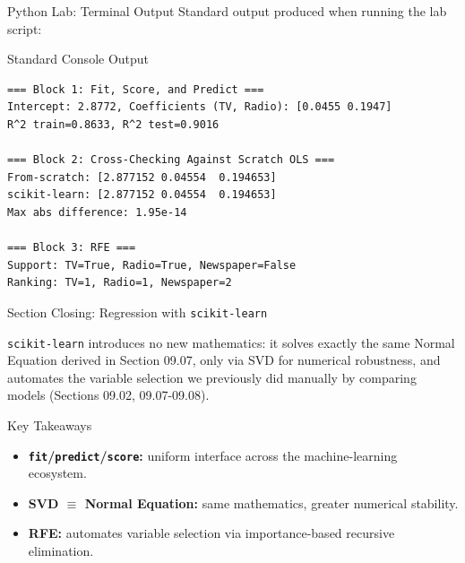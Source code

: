 \documentclass[10pt, aspectratio=169]{beamer}
\begin{document}
\begin{frame}[fragile]{Python Lab: Terminal Output}
  \scriptsize
  Standard output produced when running the lab script:
  \vspace{0.02cm}
  \begin{block}{Standard Console Output}
    \fontsize{3.4pt}{4.1pt}\selectfont
    \begin{verbatim}
=== Block 1: Fit, Score, and Predict ===
Intercept: 2.8772, Coefficients (TV, Radio): [0.0455 0.1947]
R^2 train=0.8633, R^2 test=0.9016

=== Block 2: Cross-Checking Against Scratch OLS ===
From-scratch: [2.877152 0.04554  0.194653]
scikit-learn: [2.877152 0.04554  0.194653]
Max abs difference: 1.95e-14

=== Block 3: RFE ===
Support: TV=True, Radio=True, Newspaper=False
Ranking: TV=1, Radio=1, Newspaper=2
    \end{verbatim}
  \end{block}
\end{frame}


\begin{frame}{Section Closing: Regression with \texttt{scikit-learn}}
  \begin{reflexion}
    \texttt{scikit-learn} introduces no new mathematics: it solves exactly the same Normal Equation derived in Section 09.07, only via SVD for numerical robustness, and automates the variable selection we previously did manually by comparing models (Sections 09.02, 09.07-09.08).
  \end{reflexion}

  \vspace{0.2cm}
  \pause
  \begin{block}{Key Takeaways}
    \begin{itemize}\itemsep=0.08cm
      \item \textbf{\texttt{fit}/\texttt{predict}/\texttt{score}:} uniform interface across the machine-learning ecosystem.
      \item \textbf{SVD $\equiv$ Normal Equation:} same mathematics, greater numerical stability.
      \item \textbf{RFE:} automates variable selection via importance-based recursive elimination.
    \end{itemize}
  \end{block}
\end{frame}
\end{document}
